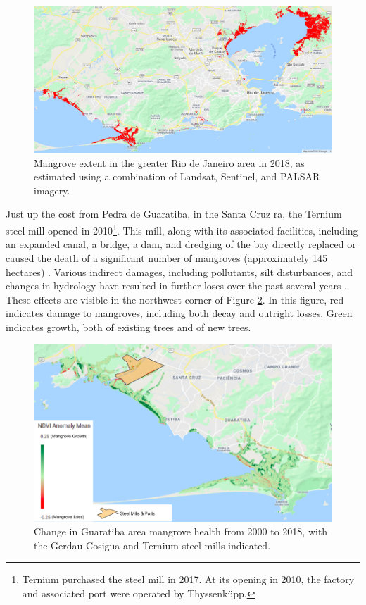 \begin{figure}[!htb]
	\centering
	\includegraphics[scale=0.25]{Figures/chap4/MangroveExtent.png}
	\caption[Mangrove extent in the greater Rio de Janeiro area in 2018]{Mangrove extent in the greater Rio de Janeiro area in 2018, as estimated using a combination of Landsat, Sentinel, and PALSAR imagery.}
	\label{fig:mangrove-extent}
\end{figure}

Just up the cost from Pedra de Guaratiba, in the Santa Cruz \ac{ra}, the Ternium steel mill opened in 2010\footnote{Ternium purchased the steel mill in 2017. At its opening in 2010, the factory and associated port were operated by Thyssenküpp.}. This mill, along with its associated facilities, including an expanded canal, a bridge, a dam, and dredging of the bay directly replaced or caused the death of a significant number of mangroves (approximately 145 hectares) \cite{ecologusESTUDOIMPACTOAMBIENTALE2005}. Various indirect damages, including pollutants, silt disturbances, and changes in hydrology have resulted in further loses over the past several years \cite{lopesTerritorialidadesEmConflitos2013}. These effects are visible in the northwest corner of Figure \ref{fig:mangrove-ndvi-anomaly}. In this figure, red indicates damage to mangroves, including both decay and outright losses. Green indicates growth, both of existing trees and of new trees.

\begin{figure}[!htb]
	\centering
	\includegraphics[scale=0.4]{Figures/chap4/NDVIanomaly_v2.png}
	\caption[Change in Guaratiba area mangrove health from 2000 to 2018]{Change in Guaratiba area mangrove health from 2000 to 2018, with the Gerdau Cosigua and Ternium steel mills indicated.}
	\label{fig:mangrove-ndvi-anomaly}
\end{figure}

